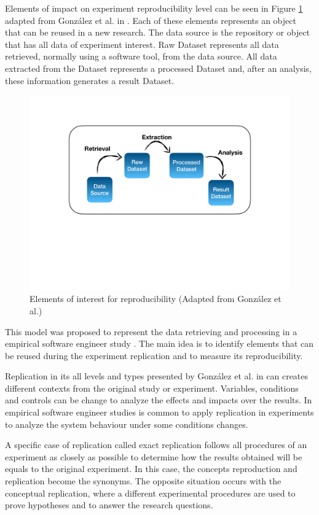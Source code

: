 Elements of impact on experiment reproducibility level can be seen in Figure \ref{grafico:elements} adapted from González et al. in \cite{exp05}. Each of these elements represents an object that can be reused in a new research. The data source is the repository or object that has all data of experiment interest. Raw Dataset represents all data retrieved, normally using a software tool, from the data source. All data extracted from the Dataset represents a processed Dataset and, after an analysis, these information generates a result Dataset.

\begin{figure}[h]
	\begin{center}
		\includegraphics[scale=.35]{diagrama01.pdf}
		\caption{Elements of interest for reproducibility (Adapted from González et al.)}
		\label{grafico:elements}
	\end{center}
\end{figure}

This model was proposed to represent the data retrieving and processing in a empirical software engineer study \cite{exp05}. The main idea is to identify elements that can be reused during the experiment replication and to measure its reproducibility.

Replication in its all levels and types presented by González et al. in \cite{exp03} can creates different contexts from the original study or experiment. Variables, conditions and controls can be change to analyze the effects and impacts over the results. In empirical software engineer studies is common to apply replication in experiments to analyze the system behaviour under some conditions changes.

A specific case of replication called exact replication \cite{exp04} follows all procedures of an experiment as closely as possible to determine how the results obtained will be equals to the original experiment. In this case, the concepts reproduction and replication become the synonyms. The opposite situation occurs with the conceptual replication, where a different experimental procedures are used to prove hypotheses and to answer the research questions. 
